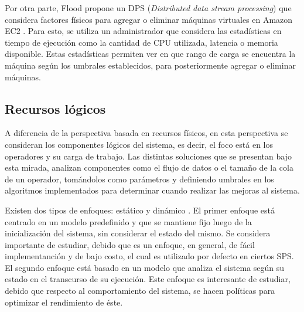 Por otra parte, Flood \citep{Alves2010flood} propone un DPS (\textit{Distributed data stream processing}) que considera factores físicos para agregar o eliminar máquinas virtuales en Amazon EC2 \citep{amazonec2}. Para esto, se utiliza un administrador que considera las estadísticas en tiempo de ejecución como la cantidad de CPU utilizada, latencia o memoria disponible. Estas estadísticas permiten ver en que rango de carga se encuentra la máquina según los umbrales establecidos, para posteriormente agregar o eliminar máquinas.

\subsection{Recursos lógicos}
\label{subsec:recLogicosBC}

A diferencia de la perspectiva basada en recursos físicos, en esta perspectiva se consideran los componentes lógicos del sistema, es decir, el foco está en los operadores y su carga de trabajo. Las distintas soluciones que se presentan bajo esta mirada, analizan componentes como el flujo de datos o el tamaño de la cola de un operador, tomándolos como parámetros y definiendo umbrales en los algoritmos implementados para determinar cuando realizar las mejoras al sistema.


Existen dos tipos de enfoques: estático y dinámico \citep{Gupta99loadsharing}. El primer enfoque está centrado en un modelo predefinido y que se mantiene fijo luego de la inicialización del sistema, sin considerar el estado del mismo. Se considera importante de estudiar, debido que es un enfoque, en general, de fácil implementanción y de bajo costo, el cual es utilizado por defecto en ciertos SPS. El segundo enfoque está basado en un modelo que analiza el sistema según su estado en el transcurso de su ejecución. Este enfoque es interesante de estudiar, debido que respecto al comportamiento del sistema, se hacen políticas para optimizar el rendimiento de éste.


